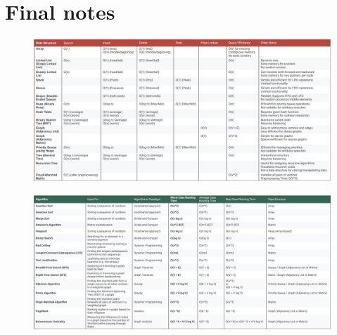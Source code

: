 \chapter{Final notes}
\begin{figure}
    \centering
    \includegraphics[width=\linewidth]{immagini/IMG-20250126-WA0027.jpg}
\end{figure}

\begin{figure}
    \centering
    \includegraphics[width=\linewidth]{immagini/IMG-20250126-WA0028.jpg}
\end{figure}